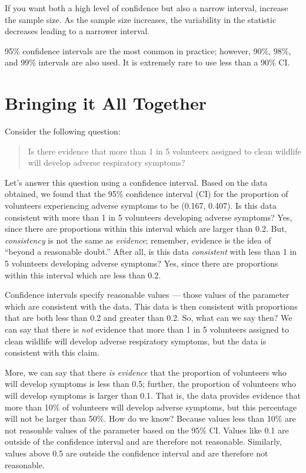 \documentclass[]{book}
\theoremstyle{definition}
\theoremstyle{definition}
\theoremstyle{definition}
\theoremstyle{remark}
\let\BeginKnitrBlock\begin \let\EndKnitrBlock\end
\begin{document}
\BeginKnitrBlock{rmdtip}
If you want both a high level of confidence but also a narrow interval,
increase the sample size. As the sample size increases, the variability
in the statistic decreases leading to a narrower interval.
\EndKnitrBlock{rmdtip}

\BeginKnitrBlock{rmdtip}
95\% confidence intervals are the most common in practice; however,
90\%, 98\%, and 99\% intervals are also used. It is extremely rare to
use less than a 90\% CI.
\EndKnitrBlock{rmdtip}

\section{Bringing it All Together}\label{bringing-it-all-together}

Consider the following question:

\begin{quote}
Is there evidence that more than 1 in 5 volunteers assigned to clean
wildlife will develop adverse respiratory symptoms?
\end{quote}

Let's answer this question using a confidence interval. Based on the
data obtained, we found that the 95\% confidence interval (CI) for the
proportion of volunteers experiencing adverse symptoms to be (0.167,
0.407). Is this data consistent with more than 1 in 5 volunteers
developing adverse symptoms? Yes, since there are proportions within
this interval which are larger than 0.2. But, \emph{consistency} is not
the same as \emph{evidence}; remember, evidence is the idea of ``beyond
a reasonable doubt.'' After all, is this data \emph{consistent} with
less than 1 in 5 volunteers developing adverse symptoms? Yes, since
there are proportions within this interval which are less than 0.2.

Confidence intervals specify reasonable values --- those values of the
parameter which are consistent with the data. This data is then
consistent with proportions that are both less than 0.2 and greater than
0.2. So, what can we say then? We can say that there is \emph{not}
evidence that more than 1 in 5 volunteers assigned to clean wildlife
will develop adverse respiratory symptoms, but the data is consistent
with this claim.

More, we can say that there \emph{is evidence} that the proportion of
volunteers who will develop symptoms is less than 0.5; further, the
proportion of volunteers who will develop symptoms is larger than 0.1.
That is, the data provides evidence that more than 10\% of volunteers
will develop adverse symptoms, but this percentage will not be larger
than 50\%. How do we know? Because values less than 10\% are not
reasonble values of the parameter based on the 95\% CI. Values like 0.1
are outside of the confidence interval and are therefore not reasonable.
Similarly, values above 0.5 are outside the confidence interval and are
therefore not reasonable.
\end{document}
